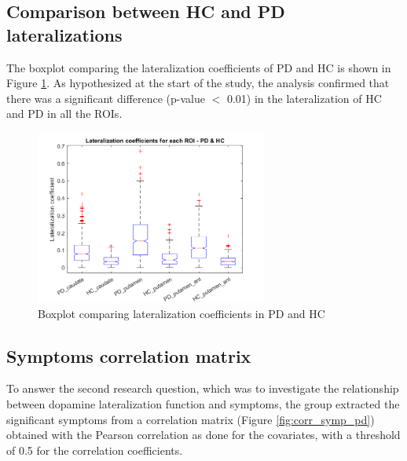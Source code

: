 \documentclass[]{article}
\begin{document}
\begin{multicols}{2}

\subsection{Comparison between HC and PD lateralizations}

The boxplot comparing the lateralization coefficients of PD and HC is shown in Figure \ref{fig:anova_plot}.
As hypothesized at the start of the study, the analysis confirmed that there was a significant difference (p-value $<$ 0.01) in the lateralization of HC and PD in all the ROIs.

\end{multicols}

\begin{figure}[h]
	\centering
	\includegraphics[width=3in]{../anova_plot_lat_hc_pd}
	\caption{Boxplot comparing lateralization coefficients in PD and HC}
	\label{fig:anova_plot}
\end{figure}

\begin{multicols}{2}

\subsection{Symptoms correlation matrix}

To answer the second research question, which was to investigate the relationship between dopamine lateralization function and symptoms, the group extracted the significant symptoms from a correlation matrix (Figure \ref{fig:corr_symp_pd}) obtained with the Pearson correlation as done for the covariates, with a threshold of 0.5 for the correlation coefficients. 

\end{multicols}
\end{document}
